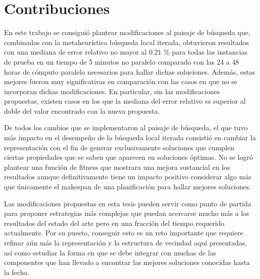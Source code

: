 \section{Contribuciones}
En este trabajo se consiguió plantear modificaciones al paisaje de búsqueda que, combinados con la metaheurística búsqueda local iterada, obtuvieron resultados 
con una mediana de error relativo no mayor al $0.21$ \% para todas las instancias de prueba en un tiempo de 5 minutos no paralelo comparado con las 24 a 48 horas 
de cómputo paralelo necesarios para hallar dichas soluciones.
%
Además, estas mejores fueron muy significativas en comparación con las casos en que no se incorporan dichas modificaciones.
%
En particular, sin las modificaciones propuestas, existen casos en los que la mediana del error relativo es superior al doble del valor encontrado con la nueva
propuesta.

De todos los cambios que se implementaron al paisaje de búsqueda, el que tuvo más impacto en el desempeño de la búsqueda local iterada consistió en cambiar 
la representación con el fin de generar exclusivamente soluciones que cumplen ciertas propiedades que se saben que aparecen en soluciones óptimas.
%
No se logró plantear una función de fitness que mostrara una mejora sustancial en los resultados aunque definitivamente tiene un impacto positivo considerar 
algo más que únicamente el makespan de una planificación para hallar mejores soluciones.

Las modificaciones propuestas en esta tesis pueden servir como punto de partida para proponer estrategias más complejas que puedan acercarse mucho más a los 
resultados del estado del arte pero en una fracción del tiempo requerido actualmente. 
%
Por su puesto, conseguir esto es un reto importante que requiere refinar aún más la representación y la estructura de vecindad aquí presentadas, así como
estudiar la forma en que se debe integrar con muchas de las componentes que han llevado a encontrar las mejores soluciones conocidas hasta la fecha.


